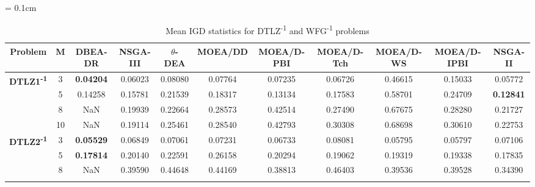 \documentclass[conference]{IEEEtran}
\begin{document}
\begin{table*}[!htb]\scriptsize
	\centering
	\renewcommand{\arraystretch}{0.9}
	\caption{Mean IGD statistics for DTLZ\textsuperscript{-1} and WFG\textsuperscript{-1} problems}
	\label{tab:IGDminus}
	\tabcolsep = 0.1cm
	\begin{tabular}{|c|c|c|c|c|c|c|c|c|c|c|}
		\noalign{\smallskip}\hline
		\textbf{Problem}                                      & \textbf{M} & \textbf{DBEA-DR} & \textbf{NSGA-III} & \textbf{$\theta$-DEA} & \textbf{MOEA/DD} & \textbf{MOEA/D-PBI} & \textbf{MOEA/D-Tch} & \textbf{MOEA/D-WS} & \textbf{MOEA/D-IPBI} & \textbf{NSGA-II} \\ \hline
		\multirow{4}{*}{\textbf{DTLZ1\textsuperscript{-1}}} & 3          & \textbf{0.04204} & 0.06023           & 0.08080               & 0.07764          & 0.07235             & 0.06726             & 0.46615            & 0.15033              & 0.05772          \\ \cline{2-11} 
		& 5          & 0.14258          & 0.15781           & 0.21539               & 0.18317          & 0.13134             & 0.17583             & 0.58701            & 0.24709              & \textbf{0.12841} \\ \cline{2-11} 
		& 8          & NaN              & 0.19939           & 0.22664               & 0.28573          & 0.42514             & 0.27490             & 0.67675            & 0.28280              & 0.21727          \\ \cline{2-11} 
		& 10         & NaN              & 0.19114           & 0.25461               & 0.28540          & 0.42793             & 0.30308             & 0.68698            & 0.30610              & 0.22753          \\ \hline
		\multirow{4}{*}{\textbf{DTLZ2\textsuperscript{-1}}} & 3          & \textbf{0.05529} & 0.06849           & 0.07061               & 0.07231          & 0.06733             & 0.08081             & 0.05795            & 0.05797              & 0.07106          \\ \cline{2-11} 
		& 5          & \textbf{0.17814} & 0.20140           & 0.22591               & 0.26158          & 0.20294             & 0.19062             & 0.19319            & 0.19338              & 0.17835          \\ \cline{2-11} 
		& 8          & NaN              & 0.39590           & 0.44648               & 0.44169          & 0.38813             & 0.46403             & 0.39536            & 0.39528              & 0.34390          \\ \cline{2-11} 

\end{tabular}
\end{table*}
\end{document}
